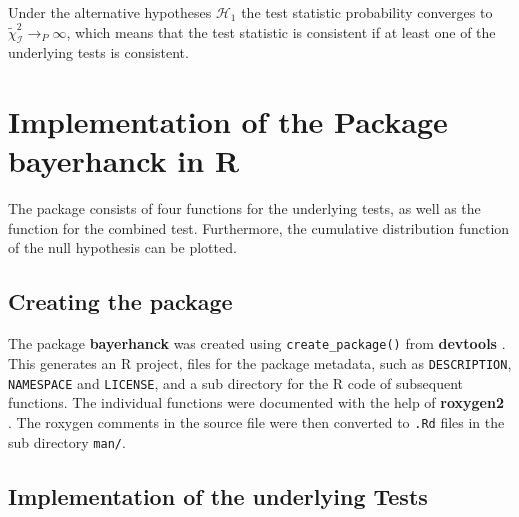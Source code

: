 \documentclass[11pt,a4paper]{article}
\begin{document}
Under the alternative hypotheses \(\mathcal{H}_1\) the test statistic
probability converges to
\(\tilde{\chi}_{\mathcal{I}}^{2} \rightarrow_P \infty\), which means
that the test statistic is consistent if at least one of the underlying
tests is consistent.

\hypertarget{implementation-of-the-package-bayerhanck-in-r}{%
\section{\texorpdfstring{Implementation of the Package
\textbf{bayerhanck} in
R}{Implementation of the Package bayerhanck in R}}\label{implementation-of-the-package-bayerhanck-in-r}}

The package consists of four functions for the underlying tests, as well
as the function for the combined test. Furthermore, the cumulative
distribution function of the null hypothesis can be plotted.

\hypertarget{creating-the-package}{%
\subsection{Creating the package}\label{creating-the-package}}

The package \textbf{bayerhanck} was created using
\texttt{create\_package()} from \textbf{devtools}
\autocite{hester_devtools_2020}. This generates an R project, files for
the package metadata, such as \texttt{DESCRIPTION}, \texttt{NAMESPACE}
and \texttt{LICENSE}, and a sub directory for the R code of subsequent
functions. The individual functions were documented with the help of
\textbf{roxygen2} \autocite{wickham_roxygen2_2020}. The roxygen comments
in the source file were then converted to \texttt{.Rd} files in the sub
directory \texttt{man/}.

\hypertarget{implementation-of-the-underlying-tests}{%
\subsection{Implementation of the underlying
Tests}\label{implementation-of-the-underlying-tests}}
\end{document}

